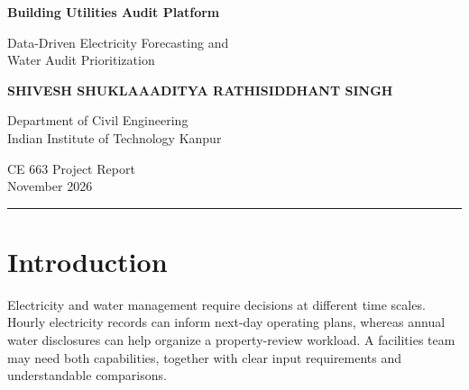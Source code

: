 \documentclass[12pt,a4paper]{article}
\begin{document}
\thispagestyle{empty}
\begin{center}
{\LARGE\bfseries Building Utilities Audit Platform\par}
\vspace{0.6em}
{\Large Data-Driven Electricity Forecasting and\\Water Audit Prioritization\par}
\vspace{2em}
{\bfseries SHIVESH SHUKLA\quad AADITYA RATHI\quad SIDDHANT SINGH\par}
\vspace{1em}
Department of Civil Engineering\\Indian Institute of Technology Kanpur
\vspace{1.2em}

CE 663 Project Report\\November 2026
\end{center}
\begin{abstract}

Building operators must anticipate electricity demand and allocate limited capacity for investigating unusual water use. This project develops a Building Utilities Audit Platform that combines next-day electricity forecasting with annual water benchmarking and portfolio review prioritization. The electricity study evaluates a pooled ridge-regression model against copy-yesterday and copy-last-week baselines using cleaned Building Data Genome Project 2 data. On 118 held-out buildings in 2017, ridge achieves 8.843 kWh hourly mean absolute error and 11.325\% median building normalized error, improving on copy-yesterday for 80 buildings. The water studies use NYC multifamily disclosures to estimate typical annual use and compare four review policies under equal budgets. At a 10\% review budget, peer-adjusted ranking identifies 153 of 197 properties with elevated next-year reported use, with 82.7\% precision and 77.7\% recall. A self-contained browser demonstration exposes inputs, quality checks, comparisons, and exports. The results support screening and investigation; they do not establish confirmed leaks, intervention benefits, or measured savings. The report documents the data, split design, methods, evaluation, implementation, and limitations of both workflows.
\end{abstract}\vfill\noindent\rule{\textwidth}{0.4pt}\newpage
\tableofcontents\newpage
\section{Introduction}
Electricity and water management require decisions at different time scales. Hourly electricity records can inform next-day operating plans, whereas annual water disclosures can help organize a property-review workload. A facilities team may need both capabilities, together with clear input requirements and understandable comparisons.
\end{document}
